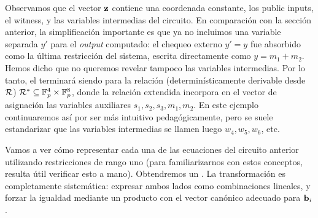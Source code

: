 Observamos que el vector $\mathbf{z}$ contiene una coordenada constante, los public inputs, el witness, y las variables intermedias del circuito. En comparación con la sección anterior, la simplificación importante es que ya no incluimos una variable separada $y'$ para el \textit{output} computado: el chequeo externo $y' = y$ fue absorbido como la última restricción del sistema, escrita directamente como $y = m_1 + m_2$. Hemos dicho que no queremos revelar tampoco las variables intermedias. Por lo tanto, el \ROneCS terminará siendo para la relación (determinísticamente derivable desde $\mathcal{R}$) $\mathcal{R}^* \subseteq \mathbb{F}_p^4 \times \mathbb{F}_p^8$, donde la relación extendida incorpora en el vector de asignación las variables auxiliares $s_1, s_2, s_3, m_1, m_2$. En este ejemplo continuaremos así por ser más intuitivo pedagógicamente, pero se suele estandarizar que las variables intermedias se llamen luego $w_4, w_5, w_6$, etc.

Vamos a ver cómo representar cada una de las ecuaciones del circuito anterior utilizando restricciones de rango uno (para familiarizarnos con estos conceptos, resulta útil verificar esto a mano). Obtendremos un \ROneCS. La transformación es completamente sistemática: expresar ambos lados como combinaciones lineales, y forzar la igualdad mediante un producto con el vector canónico adecuado para $\mathbf{b}_i$.

